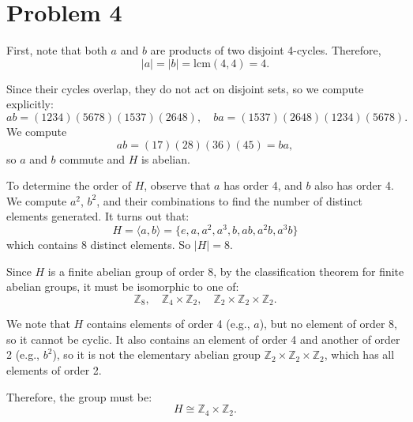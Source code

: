 \documentclass[12pt]{article}
\begin{document}
\section*{Problem 4}
First, note that both \( a \) and \( b \) are products of two disjoint 4-cycles. Therefore,
\[
|a| = |b| = \mathrm{lcm}(4, 4) = 4.
\]

Since their cycles overlap, they do not act on disjoint sets, so we compute explicitly:
\[
ab = (1234)(5678)(1537)(2648), \quad ba = (1537)(2648)(1234)(5678).
\]
We compute
\[
ab=(17)(28)(36)(45)=ba,
\]
so \(a\) and \(b\) commute and \(H\) is abelian.

To determine the order of \( H \), observe that \( a \) has order 4, and \( b \) also has order 4. We compute \( a^2 \), \( b^2 \), and their combinations to find the number of distinct elements generated. It turns out that:
\[
H = \langle a, b \rangle = \{e, a, a^2, a^3, b, ab, a^2b, a^3b\}
\]
which contains 8 distinct elements. So \( |H| = 8 \).

Since \( H \) is a finite abelian group of order 8, by the classification theorem for finite abelian groups, it must be isomorphic to one of:
\[
\mathbb{Z}_8, \quad \mathbb{Z}_4 \times \mathbb{Z}_2, \quad \mathbb{Z}_2 \times \mathbb{Z}_2 \times \mathbb{Z}_2.
\]

We note that \( H \) contains elements of order 4 (e.g., \( a \)), but no element of order 8, so it cannot be cyclic. It also contains an element of order 4 and another of order 2 (e.g., \( b^2 \)), so it is not the elementary abelian group \( \mathbb{Z}_2 \times \mathbb{Z}_2 \times \mathbb{Z}_2 \), which has all elements of order 2.

Therefore, the group must be:
\[
H \cong \mathbb{Z}_4 \times \mathbb{Z}_2.
\]
\end{document}
